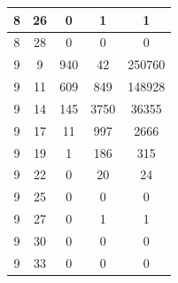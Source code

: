 \documentclass[a4paper,14pt]{extarticle}
\begin{document}
\begin{enumerate}[1.]
\begin{tabular}{|c|c|c|c|c|}
              \hline
              8                                  & 26                                & 0                                       & 1             & 1      \\
              \hline
              8                                  & 28                                & 0                                       & 0             & 0      \\
              \hline
              9                                  & 9                                 & 940                                     & 42            & 250760 \\
              \hline
              9                                  & 11                                & 609                                     & 849           & 148928 \\
              \hline
              9                                  & 14                                & 145                                     & 3750          & 36355  \\
              \hline
              9                                  & 17                                & 11                                      & 997           & 2666   \\
              \hline
              9                                  & 19                                & 1                                       & 186           & 315    \\
              \hline
              9                                  & 22                                & 0                                       & 20            & 24     \\
              \hline
              9                                  & 25                                & 0                                       & 0             & 0      \\
              \hline
              9                                  & 27                                & 0                                       & 1             & 1      \\
              \hline
              9                                  & 30                                & 0                                       & 0             & 0      \\
              \hline
              9                                  & 33                                & 0                                       & 0             & 0      \\
              \hline

\end{tabular}
\end{enumerate}
\end{document}
